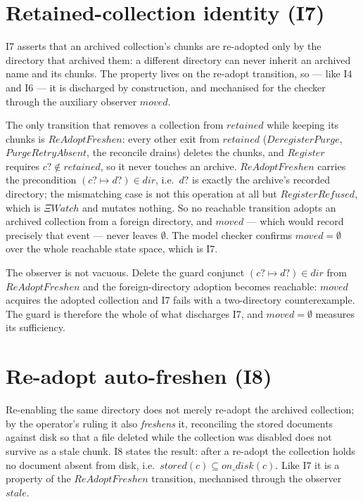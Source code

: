 \documentclass[a4paper]{article}
\begin{document}
\section{Retained-collection identity (I7)}

I7 asserts that an archived collection's chunks are re-adopted only by the
directory that archived them: a different directory can never inherit an
archived name and its chunks.  The property lives on the re-adopt transition,
so --- like I4 and I6 --- it is discharged by construction, and mechanised for
the checker through the auxiliary observer $moved$.

The only transition that removes a collection from $retained$ while keeping its
chunks is $ReAdoptFreshen$: every other exit from $retained$ ($DeregisterPurge$,
$PurgeRetryAbsent$, the reconcile drains) deletes the chunks, and $Register$
requires $c? \notin retained$, so it never touches an archive.  $ReAdoptFreshen$
carries the precondition $(c? \mapsto d?) \in dir$, i.e.\ $d?$ is exactly the
archive's recorded directory; the mismatching case is not this operation at all
but $RegisterRefused$, which is $\Xi Watch$ and mutates nothing.  So no reachable
transition adopts an archived collection from a foreign directory, and $moved$
--- which would record precisely that event --- never leaves $\emptyset$.  The
model checker confirms $moved = \emptyset$ over the whole reachable state space,
which is I7.

The observer is not vacuous.  Delete the guard conjunct $(c? \mapsto d?) \in dir$
from $ReAdoptFreshen$ and the foreign-directory adoption becomes reachable:
$moved$ acquires the adopted collection and I7 fails with a two-directory
counterexample.  The guard is therefore the whole of what discharges I7, and
$moved = \emptyset$ measures its sufficiency.

\section{Re-adopt auto-freshen (I8)}

Re-enabling the same directory does not merely re-adopt the archived collection;
by the operator's ruling it also \textit{freshens} it, reconciling the stored
documents against disk so that a file deleted while the collection was disabled
does not survive as a stale chunk.  I8 states the result: after a re-adopt the
collection holds no document absent from disk, i.e.\ $stored(c) \subseteq
on\_disk(c)$.  Like I7 it is a property of the $ReAdoptFreshen$ transition,
mechanised through the observer $stale$.
\end{document}
